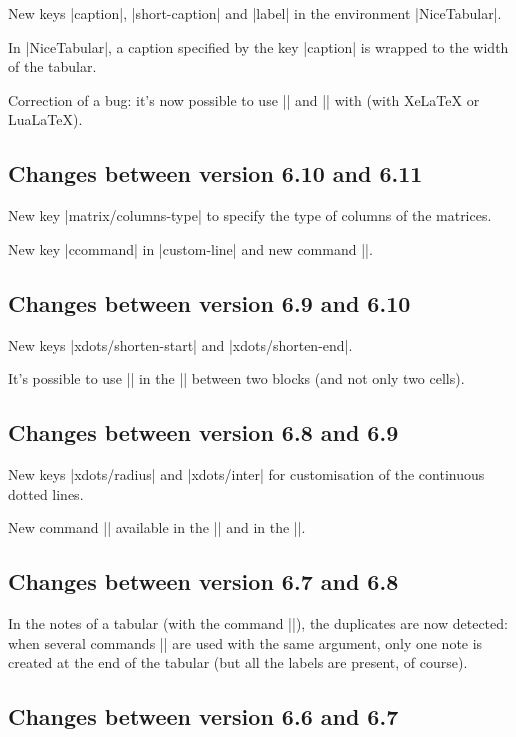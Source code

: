 \documentclass[dvipsnames]{article}%
\begin{document}
New keys |caption|, |short-caption| and |label| in the environment
|{NiceTabular}|. 

In |{NiceTabular}|, a caption specified by the key |caption| is wrapped to the 
width of the tabular.

Correction of a bug: it's now possible to use |\OverBrace| and |\UnderBrace|
with  (with XeLaTeX or LuaLaTeX).

\subsection*{Changes between version 6.10 and 6.11}

New key |matrix/columns-type| to specify the type of columns of the matrices.

New key |ccommand| in |custom-line| and new command |\cdottedline|.

\subsection*{Changes between version 6.9 and 6.10}

New keys |xdots/shorten-start| and |xdots/shorten-end|.

It's possible to use |\line| in the |\CodeAfter| between two blocks (and not
only two cells).

\subsection*{Changes between version 6.8 and 6.9}

New keys |xdots/radius| and |xdots/inter| for customisation of the continuous
dotted lines.

New command |\ShowCellNames| available in the |\CodeBefore| and in the |\CodeAfter|.

\subsection*{Changes between version 6.7 and 6.8}

In the notes of a tabular (with the command |\tabularnote|), the duplicates
are now detected: when several commands |\tabularnote| are used with the same
argument, only one note is created at the end of the tabular (but all the
labels are present, of course).

\subsection*{Changes between version 6.6 and 6.7}
\end{document}
